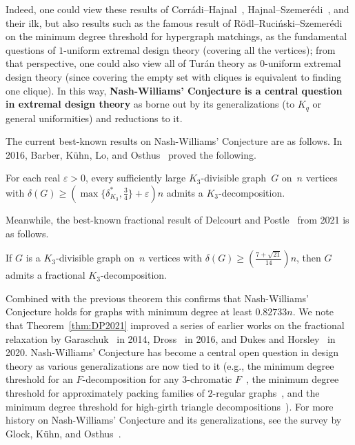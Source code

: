\documentclass[twoside,leqno]{article}
\begin{document}
Indeed, one could view these results of Corr\'adi--Hajnal~\cite{CH63}, Hajnal--Szemer\'edi~\cite{HS70}, and their ilk, but also results such as the famous result of R\"odl--Ruci\'nski--Szemer\'edi~\cite{RRS06} on the minimum degree threshold for hypergraph matchings, as the fundamental questions of $1$-uniform extremal design theory (covering all the vertices); from that perspective, one could also view all of Tur\'an theory as $0$-uniform extremal design theory (since covering the empty set with cliques is equivalent to finding one clique). In this way, {\bf Nash-Williams' Conjecture is a central question in extremal design theory} as borne out by its generalizations (to $K_q$ or general uniformities) and reductions to it.

The current best-known results on Nash-Williams' Conjecture are as follows. In 2016, Barber, K\"{u}hn, Lo, and Osthus~\cite{BKLO16} proved the following.

\begin{thm}\label{thm:BKLO}
For each real $\varepsilon>0$, every sufficiently large $K_3$-divisible graph~$G$ on~$n$ vertices with 
    $\delta(G)\ge (\max\{\delta^*_{K_3},\frac{3}{4}\}+\varepsilon)n$
    admits a $K_3$-decomposition. 
\end{thm}

Meanwhile, the best-known fractional result of Delcourt and Postle~\cite{DP2021progress} from 2021 is as follows. 

\begin{thm}\label{thm:DP2021}
If $G$ is a $K_3$-divisible graph on~$n$ vertices with $\delta(G)\ge (\frac{7+\sqrt{21}}{14})n$, then $G$ 
    admits a fractional $K_3$-decomposition. 
\end{thm}

Combined with the previous theorem this confirms that Nash-Williams' Conjecture holds for graphs with minimum degree at least $0.82733n$. We note that Theorem~\ref{thm:DP2021} improved a series of earlier works on the fractional relaxation by Garaschuk~\cite{garaschuk2014linear} in 2014, Dross~\cite{dross2016fractional} in 2016, and Dukes and Horsley~\cite{dukes_minimum_2020} in 2020. Nash-Williams' Conjecture has become a central open question in design theory as various generalizations are now tied to it (e.g., the minimum degree threshold for an $F$-decomposition for any $3$-chromatic $F$~\cite{GKLMO19}, the minimum degree threshold for approximately packing families of $2$-regular graphs~\cite{CKKO19}, and the minimum degree threshold for high-girth triangle decompositions~\cite{DHLP25}). For more history on Nash-Williams' Conjecture and its generalizations, see the survey by Glock, K\"uhn, and Osthus~\cite{GKO20Survey}.
\end{document}
